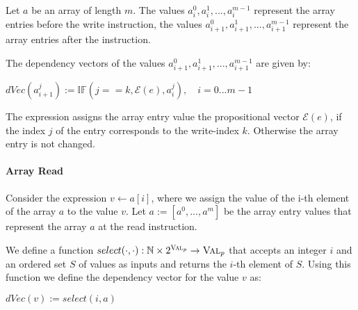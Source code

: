 Let $a$ be an array of length $m$. The values $a_i^0, a_i^1,..., a_i^{m-1}$ represent the array entries before the write instruction, the values $a_{i+1}^0, a_{i+1}^1,..., a_{i+1}^{m-1}$ represent the array entries after the instruction.

The dependency vectors of the values $a_{i+1}^0, a_{i+1}^1,..., a_{i+1}^{m-1}$ are given by:
\begin{center}
    $dVec(a_{i+1}^j) := \mathbb{IF}(j == k, \mathcal{E}(e), a_i^j), \quad i = 0...m-1$
\end{center}
The expression assigns the array entry value the propositional vector $\mathcal{E}(e)$, if the index $j$ of the entry corresponds to the write-index $k$. Otherwise the array entry is not changed.

\paragraph{Array Read}
Consider the expression $v \leftarrow a[i]$, where we assign the value of the i-th element of the array $a$ to the value $v$.
Let $a := [a^0, ..., a^m]$ be the array entry values that represent the array $a$ at the read instruction.

We define a function $select(\cdot, \cdot): \mathbb{N} \times 2^{\textsc{Val}_p} \to \textsc{Val}_p$ that accepts an integer $i$ and an ordered set $S$ of values as inputs and returns the $i$-th element of $S$. Using this function we define the dependency vector for the value $v$ as:
\begin{center}
    $dVec(v) := select(i, a)$
\end{center}